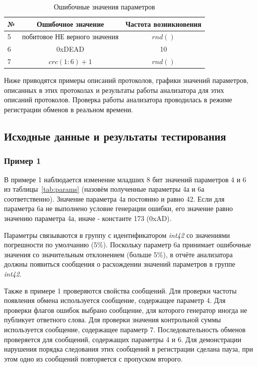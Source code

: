 \begin{table}[H]
 \centering
 \begin{tabular}{|l|c|c|}
  \hline
  № & Ошибочное значение & Частота возникновения \\
  \hline
  5 & побитовое НЕ верного значения & $rnd()$ \\
  6 & 0xDEAD & 10 \\
  7 & $crc(1:6) + 1$ & $rnd()$ \\
  \hline
 \end{tabular}
 \caption{Ошибочные значения параметров}
 \label{tab:param_errors}
\end{table}


Ниже приводятся примеры описаний протоколов, графики значений параметров, 
описанных в этих протоколах и результаты работы анализатора для этих 
описаний протоколов. Проверка работы анализатора проводилась в режиме 
регистрации обменов в реальном времени.

\subsection{Исходные данные и результаты тестирования}

\subsubsection{Пример 1}

В примере 1 наблюдается изменение младших 8 бит значений параметров 4 
и 6 из таблицы~\ref{tab:params} (назовём полученные параметры 4а и 6а 
соответственно). Значение параметра 4а 
постоянно и равно 42. Если для параметра 6а не выполнено условие генерации 
ошибки, его значение равно значению параметра 4а, иначе - константе 173 (0xAD). 

Параметры связываются в группу с идентификатором \textit{int42} со 
значениями погрешности по умолчанию (5\%). Поскольку параметр 6а принимает 
ошибочные значения со значительным отклонением (больше 5\%), в отчёте 
анализатора должны появиться сообщения о расхождении значений параметров в 
группе \textit{int42}.

Также в примере 1 проверяются свойства сообщений. Для проверки частоты 
появления обмена используется сообщение, содержащее параметр 4. Для проверки 
флагов ошибок выбрано сообщение, для которого генератор иногда не публикует 
ответного слова. Для проверки значения контрольной суммы используется 
сообщение, содержащее параметр 7. Последовательность обменов проверяется для 
сообщений, содержащих параметры 4 и 6. Для демонстрации нарушения порядка 
следования этих сообщений в регистрации сделана пауза, при этом одно из 
сообщений повторяется с пропуском второго.


